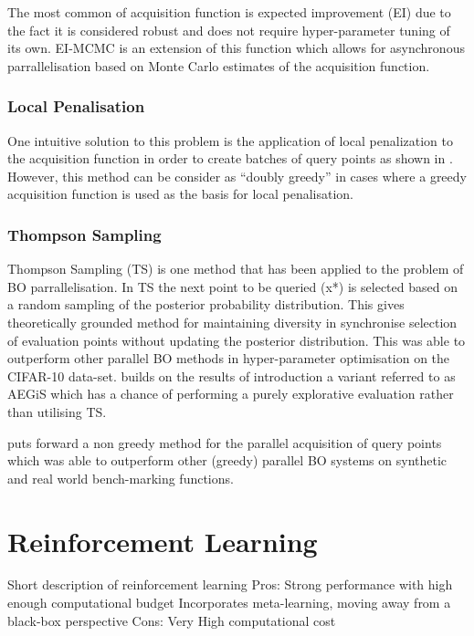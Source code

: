 \documentclass{article}
\begin{document}
			The most common of acquisition function is expected improvement (EI) due to the fact it is considered robust and does not require hyper-parameter tuning of its own. \cite{17} EI-MCMC is an extension of this function which allows for asynchronous parrallelisation based on Monte Carlo estimates of the acquisition function.



		\subsubsection{Local Penalisation}

			One intuitive solution to this problem is the application of local penalization to the acquisition function in order to create batches of query points as shown in \cite{37}. However, this method can be consider as “doubly greedy” \cite{36} in cases where a greedy acquisition function is used as the basis for local penalisation.




		\subsubsection{Thompson Sampling}

			Thompson Sampling (TS) is one method that has been applied to the problem of BO parrallelisation\cite{26}\cite{27}. In TS the next point to be queried (x*) is selected based on a random sampling of the posterior probability distribution. This gives theoretically grounded method for maintaining diversity in synchronise selection of evaluation points without updating the posterior distribution. This was able to outperform other parallel BO methods in hyper-parameter optimisation on the CIFAR-10 data-set. 
			\cite{26} builds on the results of \cite{27} introduction a variant referred to as AEGiS which has a chance of performing a purely explorative evaluation rather than utilising TS.

			 \cite{36} puts forward a non greedy method for the parallel acquisition of query points which was able to outperform other (greedy) parallel BO systems on synthetic and real world bench-marking functions.




\section{Reinforcement Learning}

    Short description of reinforcement learning 
    Pros:
        Strong performance with high enough computational budget
        Incorporates meta-learning, moving away from a black-box perspective
    Cons:
        Very High computational cost
\end{document}
